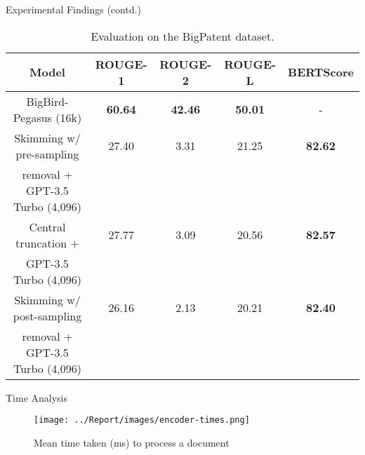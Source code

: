\begin{frame}{Experimental Findings (contd.)}

  \begin{table}[!ht]
    \centering
    \tiny
  
    \begin{tabular}{c c c c c}
      \hline
      Model & ROUGE-1 & ROUGE-2 & ROUGE-L & BERTScore \\
      \hline
      BigBird-Pegasus (16k) & \textbf{60.64} & \textbf{42.46} & \textbf{50.01} & - \\
      \hline
      Skimming w/ pre-sampling & 27.40 & 3.31 & 21.25 & \textbf{82.62} \\
      removal + GPT-3.5 Turbo (4,096) & & & & \\
      Central truncation + & 27.77 & 3.09 & 20.56 & \textbf{82.57} \\
      GPT-3.5 Turbo (4,096) & & & & \\
      Skimming w/ post-sampling & 26.16 & 2.13 & 20.21 & \textbf{82.40} \\
      removal + GPT-3.5 Turbo (4,096) & & & & \\
      \hline
    \end{tabular}
  
    \caption{Evaluation on the BigPatent dataset.}
  \end{table}

\end{frame}

\begin{frame}{Time Analysis}

  \begin{figure}
    \centering
    \texttt{[image: ../Report/images/encoder-times.png]}
    \caption{Mean time taken (ms) to process a document}
  \end{figure}
  
\end{frame}
